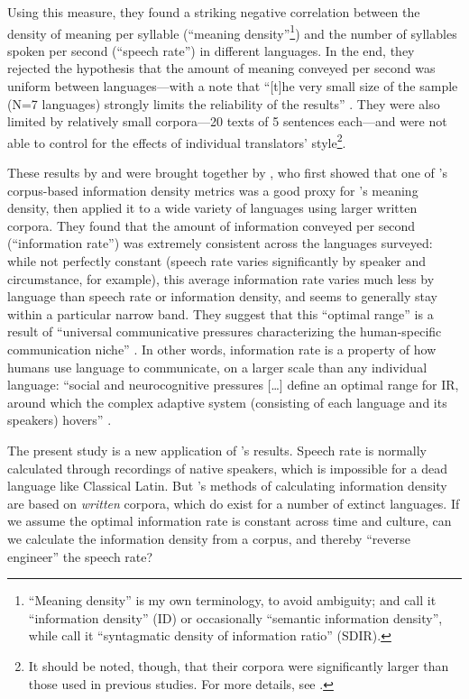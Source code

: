\documentclass[12pt,twoside]{article}
\begin{document}
Using this measure, they found a striking negative correlation between the density of meaning per syllable (``meaning density''\footnote{``Meaning density'' is my own terminology, to avoid ambiguity; \citet{pellegrino} and \citet{oh} call it ``information density'' (ID) or occasionally ``semantic information density'', while \citet{coupé} call it ``syntagmatic density of information ratio'' (SDIR).}) and the number of syllables spoken per second (``speech rate'') in different languages. In the end, they rejected the hypothesis that the amount of meaning conveyed per second was uniform between languages---with a note that ``[t]he very small size of the sample (N=7 languages) strongly limits the reliability of the results'' \citep[550]{pellegrino}. They were also limited by relatively small corpora---20 texts of 5 sentences each---and were not able to control for the effects of individual translators' style\footnote{It should be noted, though, that their corpora were significantly larger than those used in previous studies. For more details, see \citep[545]{pellegrino}.}.

These results by \citet{oh} and \citet{pellegrino} were brought together by \citet{coupé}, who first showed that one of \citeauthor{oh}'s corpus-based information density metrics was a good proxy for \citeauthor{pellegrino}'s meaning density, then applied it to a wide variety of languages using larger written corpora. They found that the amount of information conveyed per second (``information rate'') was extremely consistent across the languages surveyed: while not perfectly constant (speech rate varies significantly by speaker and circumstance, for example), this average information rate varies much less by language than speech rate or information density, and seems to generally stay within a particular narrow band. They suggest that this ``optimal range'' is a result of ``universal communicative pressures characterizing the human-specific communication niche'' \citep[6]{coupé}. In other words, information rate is a property of how humans use language to communicate, on a larger scale than any individual language: ``social and neurocognitive pressures [\ldots] define an optimal range for IR, around which the complex adaptive system (consisting of each language and its speakers) hovers'' \citep[6]{coupé}.

The present study is a new application of \citeauthor{coupé}'s results. Speech rate is normally calculated through recordings of native speakers, which is impossible for a dead language like Classical Latin. But \citeauthor{oh}'s methods of calculating information density are based on \emph{written} corpora, which do exist for a number of extinct languages. If we assume the optimal information rate is constant across time and culture, can we calculate the information density from a corpus, and thereby ``reverse engineer'' the speech rate?
\end{document}
